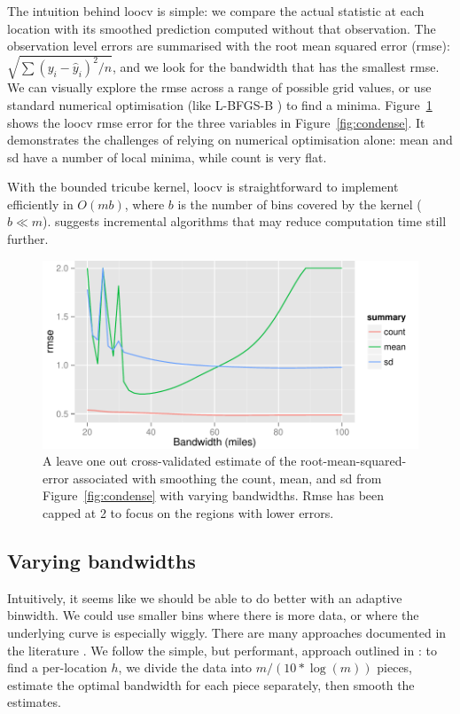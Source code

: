 \documentclass[journal]{vgtc}                %
\begin{document}
The intuition behind {\sc loocv} is simple: we compare the actual statistic at each location with its smoothed prediction computed without that observation. The observation level errors are summarised with the root mean squared error (rmse): $\sqrt{ \sum (y_i - \hat{y}_i)^2 / n}$, and we look for the bandwidth that has the smallest rmse. We can visually explore the rmse across a range of possible grid values, or use standard numerical optimisation (like L-BFGS-B \citep{byrd:1995}) to find a minima. Figure~\ref{fig:smooth-rmse} shows the {\sc loocv} rmse error for the three variables in Figure~\ref{fig:condense}. It demonstrates the challenges of relying on numerical optimisation alone: mean and sd have a number of local minima, while count is very flat.

With the bounded tricube kernel, {\sc loocv} is straightforward to implement efficiently in $O(m b)$, where $b$ is the number of bins covered by the kernel ($b \ll m$). \citep{fan:1994} suggests incremental algorithms that may reduce computation time still further.

\begin{figure}[htb]
 \centering
 \includegraphics[width=\linewidth]{smooth-rmse}
 \caption{A leave one out cross-validated estimate of the root-mean-squared-error associated with smoothing the count, mean, and sd from Figure~\ref{fig:condense} with varying bandwidths. Rmse has been capped at 2 to focus on the regions with lower errors.}
 \label{fig:smooth-rmse}
\end{figure}


\subsection{Varying bandwidths}

Intuitively, it seems like we should be able to do better with an adaptive binwidth. We could use smaller bins where there is more data, or where the underlying curve is especially wiggly. There are many approaches documented in the literature  \citep{terrell:1992, brockmann:1993,schucany:1995,herrmann:1997}. We follow the simple, but performant, approach outlined in \citep{fan:1995}: to find a per-location $h$, we divide the data into $m / (10 * \log(m))$ pieces, estimate the optimal bandwidth for each piece separately, then smooth the estimates.
\end{document}
